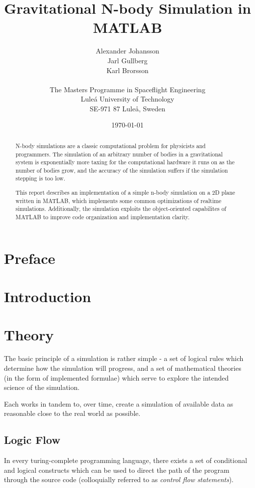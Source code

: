 \documentclass[11pt]{article}
\title{\textbf{Gravitational N-body Simulation in MATLAB}}
\author{Alexander Johansson\\
		Jarl Gullberg\\
		Karl Brorsson\\
		\\
		The Masters Programme in Spaceflight Engineering\\
		Lule\'a University of Technology\\SE-971 87 Luleå, Sweden}
\date{\today}
\begin{document}
\maketitle

\begin{abstract}
N-body simulations are a classic computational problem for physicists and programmers. The simulation of 
an arbitrary number of bodies in a gravitational system is exponentially more taxing for the computational 
hardware it runs on as the number of bodies grow, and the accuracy of the simulation suffers if the simulation
stepping is too low.

This report describes an implementation of a simple n-body simulation on a 2D plane written in MATLAB, which 
implements some common optimizations of realtime simulations. Additionally, the simulation exploits the 
object-oriented capabilites of MATLAB to improve code organization and implementation clarity.
\end{abstract}

\pagebreak
\listoftodos
\tableofcontents

\pagebreak
\section{Preface}

\section{Introduction}

\section{Theory}
The basic principle of a simulation is rather simple - a set of logical rules which determine how the 
simulation will progress, and a set of mathematical theories (in the form of implemented formulae) which
serve to explore the intended science of the simulation.

Each works in tandem to, over time, create a simulation of available data as reasonable close to the real 
world as possible.
\subsection{Logic Flow}
In every turing-complete programming language, there exists a set of conditional and logical constructs
which can be used to direct the path of the program through the source code (colloquially referred to as \emph{control flow statements}). 
\end{document}
